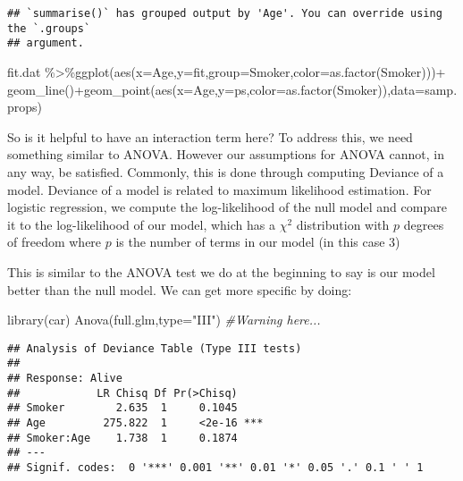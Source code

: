 \documentclass[
]{article}
\newenvironment{Shaded}{\begin{snugshade}}{\end{snugshade}}
\newcommand{\AttributeTok}[1]{\textcolor[rgb]{0.77,0.63,0.00}{#1}}
\newcommand{\CommentTok}[1]{\textcolor[rgb]{0.56,0.35,0.01}{\textit{#1}}}
\newcommand{\FunctionTok}[1]{\textcolor[rgb]{0.00,0.00,0.00}{#1}}
\newcommand{\NormalTok}[1]{#1}
\newcommand{\SpecialCharTok}[1]{\textcolor[rgb]{0.00,0.00,0.00}{#1}}
\newcommand{\StringTok}[1]{\textcolor[rgb]{0.31,0.60,0.02}{#1}}
\begin{document}
\begin{verbatim}
## `summarise()` has grouped output by 'Age'. You can override using the `.groups`
## argument.
\end{verbatim}

\begin{Shaded}
\begin{Highlighting}[]
\NormalTok{fit.dat }\SpecialCharTok{\%\textgreater{}\%}\FunctionTok{ggplot}\NormalTok{(}\FunctionTok{aes}\NormalTok{(}\AttributeTok{x=}\NormalTok{Age,}\AttributeTok{y=}\NormalTok{fit,}\AttributeTok{group=}\NormalTok{Smoker,}\AttributeTok{color=}\FunctionTok{as.factor}\NormalTok{(Smoker)))}\SpecialCharTok{+}
  \FunctionTok{geom\_line}\NormalTok{()}\SpecialCharTok{+}\FunctionTok{geom\_point}\NormalTok{(}\FunctionTok{aes}\NormalTok{(}\AttributeTok{x=}\NormalTok{Age,}\AttributeTok{y=}\NormalTok{ps,}\AttributeTok{color=}\FunctionTok{as.factor}\NormalTok{(Smoker)),}\AttributeTok{data=}\NormalTok{samp.props)}
\end{Highlighting}
\end{Shaded}

So is it helpful to have an interaction term here? To address this, we
need something similar to ANOVA. However our assumptions for ANOVA
cannot, in any way, be satisfied. Commonly, this is done through
computing Deviance of a model. Deviance of a model is related to maximum
likelihood estimation. For logistic regression, we compute the
log-likelihood of the null model and compare it to the log-likelihood of
our model, which has a \(\chi^2\) distribution with \(p\) degrees of
freedom where \(p\) is the number of terms in our model (in this case 3)

This is similar to the ANOVA test we do at the beginning to say is our
model better than the null model. We can get more specific by doing:

\begin{Shaded}
\begin{Highlighting}[]
\FunctionTok{library}\NormalTok{(car)}
\FunctionTok{Anova}\NormalTok{(full.glm,}\AttributeTok{type=}\StringTok{"III"}\NormalTok{) }\CommentTok{\#Warning here...}
\end{Highlighting}
\end{Shaded}

\begin{verbatim}
## Analysis of Deviance Table (Type III tests)
## 
## Response: Alive
##            LR Chisq Df Pr(>Chisq)    
## Smoker        2.635  1     0.1045    
## Age         275.822  1     <2e-16 ***
## Smoker:Age    1.738  1     0.1874    
## ---
## Signif. codes:  0 '***' 0.001 '**' 0.01 '*' 0.05 '.' 0.1 ' ' 1
\end{verbatim}
\end{document}
